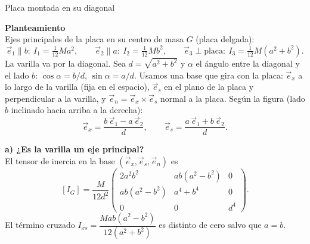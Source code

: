 \begin{solucion}{Placa montada en su diagonal}

\textbf{Planteamiento}\\
Ejes principales de la placa en su centro de masa $G$ (placa delgada):
\[
\vec{e}_1 \parallel b:\ I_1 = \tfrac{1}{12}Ma^2,\qquad
\vec{e}_2 \parallel a:\ I_2 = \tfrac{1}{12}Mb^2,\qquad
\vec{e}_3 \perp \text{placa}:\ I_3 = \tfrac{1}{12}M(a^2+b^2).
\]
La varilla va por la diagonal. Sea $d=\sqrt{a^2+b^2}$ y $\alpha$ el ángulo entre la diagonal y el lado $b$: $\cos\alpha=b/d$, $\sin\alpha=a/d$. Usamos una base que gira con la placa: $\vec{e}_x$ a lo largo de la varilla (fija en el espacio), $\vec{e}_s$ en el plano de la placa y perpendicular a la varilla, y $\vec{e}_n=\vec{e}_x\times\vec{e}_s$ normal a la placa. Según la figura (lado $b$ inclinado hacia arriba a la derecha):
\[
\vec{e}_x = \frac{b\,\vec{e}_1 - a\,\vec{e}_2}{d},\qquad
\vec{e}_s = \frac{a\,\vec{e}_1 + b\,\vec{e}_2}{d}.
\]

\textbf{a) ¿Es la varilla un eje principal?}\\
El tensor de inercia en la base $(\vec{e}_x,\vec{e}_s,\vec{e}_n)$ es
\[
[I_G] = \frac{M}{12d^2}
\begin{pmatrix}
2a^2b^2 & ab(a^2-b^2) & 0\\
ab(a^2-b^2) & a^4+b^4 & 0\\
0 & 0 & d^4
\end{pmatrix}.
\]
El término cruzado $I_{xs}=\dfrac{Mab(a^2-b^2)}{12(a^2+b^2)}$ es distinto de cero salvo que $a=b$.


\end{solucion}
